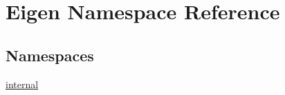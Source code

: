 \hypertarget{namespace_eigen}{\section{Eigen Namespace Reference}
\label{namespace_eigen}
}
\subsection*{Namespaces}
\begin{DoxyCompactItemize}
\item 
 \hyperlink{namespace_eigen_1_1internal}{internal}
\end{DoxyCompactItemize}
